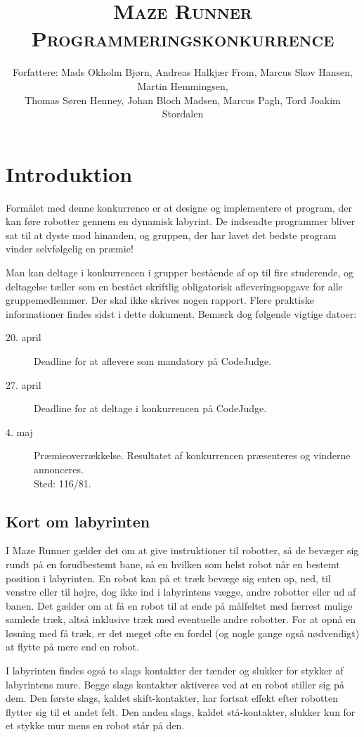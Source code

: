 \documentclass[10pt, a4paper]{article}
\title{\textsc{\Huge Maze Runner}\\\textsc{Programmeringskonkurrence}}
\date{}
\author{{\small Forfattere:
    Mads Okholm Bjørn,
    Andreas Halkjær From,
    Marcus Skov Hansen,
    Martin Hemmingsen,
  }\\{\small
    Thomas Søren Henney,
    Johan Bloch Madsen,
    Marcus Pagh,
    Tord Joakim Stordalen
}}
\begin{document}
\maketitle

\section{Introduktion}
Formålet med denne konkurrence er at designe og implementere et program, der kan føre robotter gennem en dynamisk labyrint.
De indsendte programmer bliver sat til at dyste mod hinanden, og gruppen, der har lavet det bedste program vinder selvfølgelig en præmie!

Man kan deltage i konkurrencen i grupper bestående af op til fire studerende, og deltagelse tæller som en bestået skriftlig obligatorisk afleveringsopgave for alle gruppemedlemmer.
Der skal ikke skrives nogen rapport.
Flere praktiske informationer findes sidst i dette dokument.
Bemærk dog følgende vigtige datoer:

\begin{description}
\item [20. april] Deadline for at aflevere som mandatory på CodeJudge.
\item [27. april] Deadline for at deltage i konkurrencen på CodeJudge.
\item [4. maj] Præmieoverrækkelse. Resultatet af konkurrencen præsenteres og vinderne annonceres.\\Sted: 116/81.
\end{description}

\subsection{Kort om labyrinten}
I Maze Runner gælder det om at give instruktioner til robotter, så de bevæger sig rundt på en forudbestemt bane, så en hvilken som helst robot når en bestemt position i labyrinten.
En robot kan på et træk bevæge sig enten op, ned, til venstre eller til højre, dog ikke ind i labyrintens vægge, andre robotter eller ud af banen.
Det gælder om at få en robot til at ende på målfeltet med færrest mulige samlede træk, altså inklusive træk med eventuelle andre robotter.
For at opnå en løsning med få træk, er det meget ofte en fordel (og nogle gange også nødvendigt) at flytte på mere end en robot.

I labyrinten findes også to slags kontakter der tænder og slukker for stykker af labyrintens mure.
Begge slags kontakter aktiveres ved at en robot stiller sig på dem.
Den første slags, kaldet skift-kontakter, har fortsat effekt efter robotten flytter sig til et andet felt.
Den anden slags, kaldet stå-kontakter, slukker kun for et stykke mur mens en robot står på den.
\end{document}

